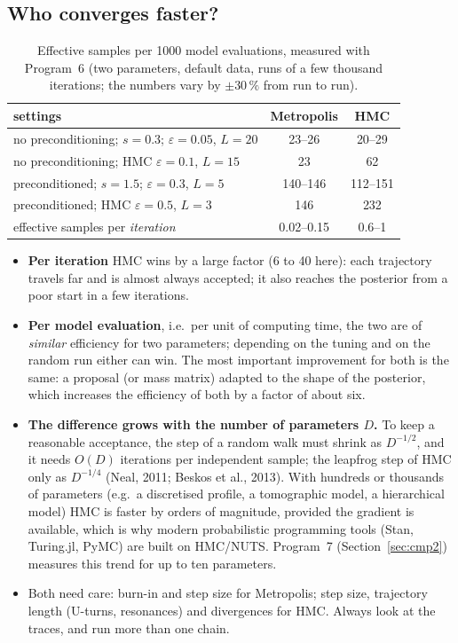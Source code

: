 \documentclass[11pt,a4paper]{article}
\begin{document}
\subsection{Who converges faster?}
\begin{table}[H]
\centering\small
\caption{Effective samples per 1000 model evaluations, measured with Program~6 (two parameters, default data,
runs of a few thousand iterations; the numbers vary by $\pm30\,\%$ from run to run).}\label{tab:cmp}
\begin{tabular}{@{}lcc@{}}
\toprule
settings & Metropolis & HMC \\
\midrule
no preconditioning; $s=0.3$; $\varepsilon=0.05$, $L=20$ & 23--26 & 20--29 \\
no preconditioning; HMC $\varepsilon=0.1$, $L=15$         & 23     & 62 \\
preconditioned; $s=1.5$; $\varepsilon=0.3$, $L=5$         & 140--146 & 112--151 \\
preconditioned; HMC $\varepsilon=0.5$, $L=3$              & 146    & 232 \\
\midrule
effective samples per \emph{iteration}                    & 0.02--0.15 & 0.6--1 \\
\bottomrule
\end{tabular}
\end{table}
\begin{keypoint}
\begin{itemize}[leftmargin=*]
\item \textbf{Per iteration} HMC wins by a large factor (6 to 40 here): each trajectory travels far and is almost
  always accepted; it also reaches the posterior from a poor start in a few iterations.
\item \textbf{Per model evaluation}, i.e.\ per unit of computing time, the two are of \emph{similar}
  efficiency for two parameters; depending on the tuning and on the random run either can win. The most
  important improvement for both is the same: a proposal (or mass matrix) adapted to the shape of the posterior,
  which increases the efficiency of both by a factor of about six.
\item \textbf{The difference grows with the number of parameters $D$.} To keep a reasonable acceptance, the step
  of a random walk must shrink as $D^{-1/2}$, and it needs $O(D)$ iterations per independent sample; the
  leapfrog step of HMC only as $D^{-1/4}$ (Neal, 2011; Beskos et al., 2013). With hundreds or thousands of
  parameters (e.g.\ a discretised profile, a tomographic model, a hierarchical model) HMC is faster by orders
  of magnitude, provided the gradient is available, which is why modern probabilistic programming tools
  (Stan, Turing.jl, PyMC) are built on HMC/NUTS. Program~7 (Section~\ref{sec:cmp2}) measures this trend for up to
  ten parameters.
\item Both need care: burn-in and step size for Metropolis; step size, trajectory length (U-turns, resonances)
  and divergences for HMC. Always look at the traces, and run more than one chain.
\end{itemize}
\end{keypoint}
\end{document}
